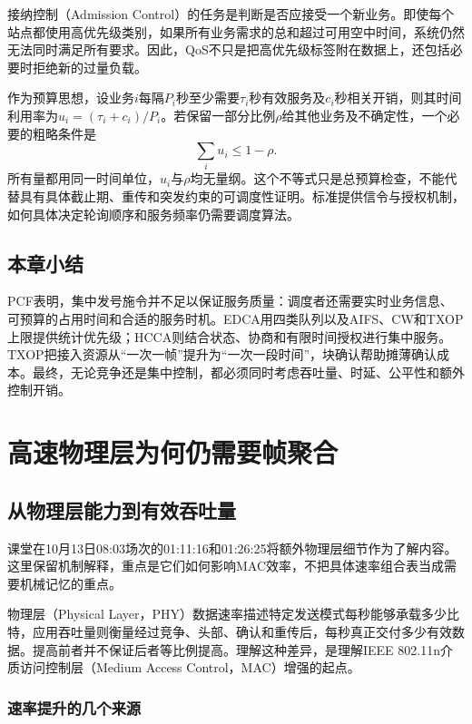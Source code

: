 接纳控制（Admission Control）的任务是判断是否应接受一个新业务。即使每个站点都使用高优先级类别，如果所有业务需求的总和超过可用空中时间，系统仍然无法同时满足所有要求。因此，QoS不只是把高优先级标签附在数据上，还包括必要时拒绝新的过量负载。

作为预算思想，设业务$i$每隔$P_i$秒至少需要$\tau_i$秒有效服务及$c_i$秒相关开销，则其时间利用率为$u_i=(\tau_i+c_i)/P_i$。若保留一部分比例$\rho$给其他业务及不确定性，一个必要的粗略条件是
\begin{equation}
\sum_i u_i\leq 1-\rho.
\end{equation}
所有量都用同一时间单位，$u_i$与$\rho$均无量纲。这个不等式只是总预算检查，不能代替具有具体截止期、重传和突发约束的可调度性证明。标准提供信令与授权机制，如何具体决定轮询顺序和服务频率仍需要调度算法。

\subsection{本章小结}

PCF表明，集中发号施令并不足以保证服务质量：调度者还需要实时业务信息、可预算的占用时间和合适的服务时机。EDCA用四类队列以及AIFS、CW和TXOP上限提供统计优先级；HCCA则结合状态、协商和有限时间授权进行集中服务。TXOP把接入资源从“一次一帧”提升为“一次一段时间”，块确认帮助摊薄确认成本。最终，无论竞争还是集中控制，都必须同时考虑吞吐量、时延、公平性和额外控制开销。

\section{高速物理层为何仍需要帧聚合}
\label{chap:aggregation}

\subsection{从物理层能力到有效吞吐量}

课堂在10月13日08:03场次的01:11:16和01:26:25将额外物理层细节作为了解内容。这里保留机制解释，重点是它们如何影响MAC效率，不把具体速率组合表当成需要机械记忆的重点。

物理层（Physical Layer，PHY）数据速率描述特定发送模式每秒能够承载多少比特，应用吞吐量则衡量经过竞争、头部、确认和重传后，每秒真正交付多少有效数据。提高前者并不保证后者等比例提高。理解这种差异，是理解IEEE 802.11n介质访问控制层（Medium Access Control，MAC）增强的起点。

\subsubsection{速率提升的几个来源}

